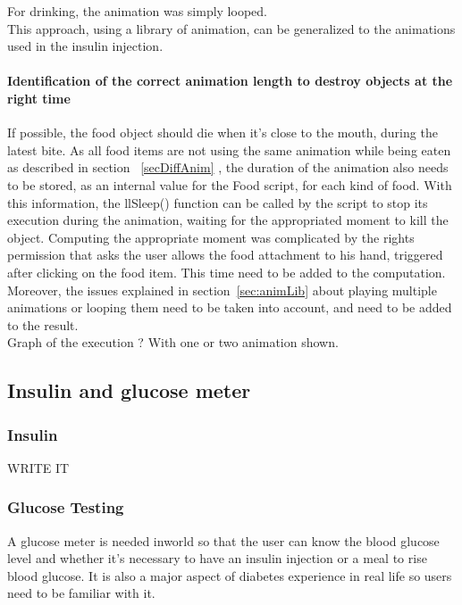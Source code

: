 For drinking, the animation was simply looped.\\

This approach, using a library of animation, can be generalized to the animations used in the insulin injection.

	\paragraph{Identification of the correct animation length to destroy objects at the right time}
\label{sec:animBite}
If possible, the food object should die when it's close to the mouth, during the latest bite. As all food items are not using the same animation while being eaten as described in section ~\ref{secDiffAnim} , the duration of the animation also needs to be stored, as an internal value for the Food script, for each kind of food. With this information, the llSleep() function can be called by the script to stop its execution during the animation, waiting for the appropriated moment to kill the object. 
Computing the appropriate moment was complicated by the rights permission that asks the user allows the food attachment to his hand, triggered after clicking on the food item. This time need to be added to the computation. Moreover, the issues explained in section~\ref{sec:animLib} about playing multiple animations or looping them need to be taken into account, and need to be added to the result.\\
Graph of the execution ? With one or two animation shown. %

\subsection{Insulin and glucose meter}
	\subsubsection{Insulin} 
	WRITE IT
	\subsubsection{Glucose Testing}

A glucose meter is needed inworld so that the user can know the blood glucose level and whether it's necessary to have an insulin injection or a meal to rise blood glucose. It is also a major aspect of diabetes experience in real life so users need to be familiar with it.

